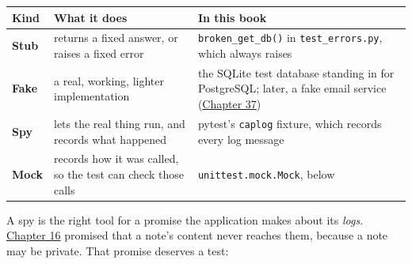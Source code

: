 {\def\LTcaptype{none} %
\begin{longtable}[]{@{}
  >{\raggedright\arraybackslash}p{}
  >{\raggedright\arraybackslash}p{}
  >{\raggedright\arraybackslash}p{}@{}}
\toprule\noalign{}
\begin{minipage}[b]{\linewidth}\raggedright
Kind
\end{minipage} & \begin{minipage}[b]{\linewidth}\raggedright
What it does
\end{minipage} & \begin{minipage}[b]{\linewidth}\raggedright
In this book
\end{minipage} \\
\midrule\noalign{}
\endhead
\bottomrule\noalign{}
\endlastfoot
\textbf{Stub} & returns a fixed answer, or raises a fixed error & \texttt{broken\_get\_db()} in \texttt{test\_errors.py}, which always raises \\
\textbf{Fake} & a real, working, lighter implementation & the SQLite test database standing in for PostgreSQL; later, a fake email service (\hyperref[ch:37-reliability]{Chapter 37}) \\
\textbf{Spy} & lets the real thing run, and records what happened & pytest's \texttt{caplog} fixture, which records every log message \\
\textbf{Mock} & records how it was called, so the test can check those calls & \texttt{unittest.mock.Mock}, below \\
\end{longtable}
}

A spy is the right tool for a promise the application makes about its \emph{logs}. \hyperref[ch:16-logging-error-handling]{Chapter 16} promised that a note's content never reaches them, because a note may be private. That promise deserves a test:

\begin{codebox}[short]

\begin{Shaded}
\begin{Highlighting}[]
\OperatorTok{=}\NormalTok{\{}\NormalTok{: } \OperatorTok{+}  \OperatorTok{*} \NormalTok{\})}
      
       
\end{Highlighting}
\end{Shaded}

\end{codebox}

